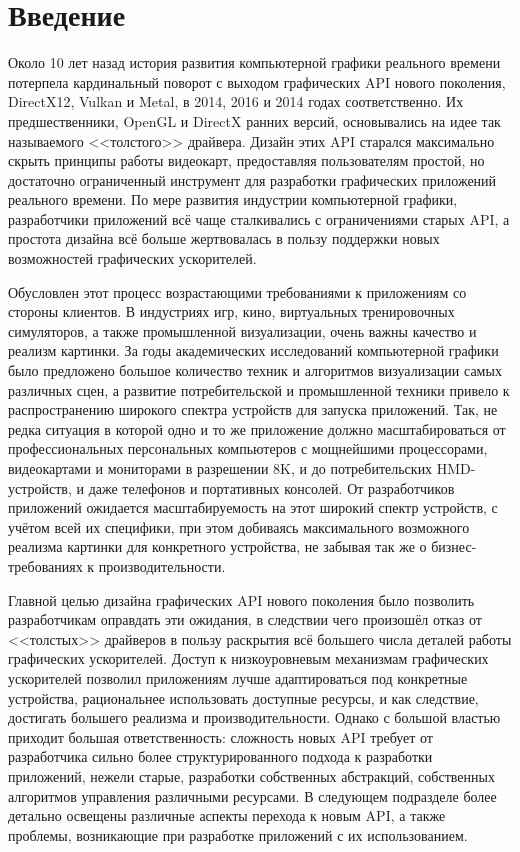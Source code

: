 \section{Введение}
Около 10 лет назад история развития компьютерной графики реального времени потерпела кардинальный поворот с выходом графических API нового поколения, DirectX12, Vulkan и Metal, в 2014, 2016 и 2014 годах соответственно.
Их предшественники, OpenGL и DirectX ранних версий, основывались на идее так называемого <<толстого>> драйвера.
Дизайн этих API старался максимально скрыть принципы работы видеокарт, предоставляя пользователям простой, но достаточно ограниченный инструмент для разработки графических приложений реального времени.
По мере развития индустрии компьютерной графики, разработчики приложений всё чаще сталкивались с ограничениями старых API, а простота дизайна всё больше жертвовалась в пользу поддержки новых возможностей графических ускорителей.

Обусловлен этот процесс возрастающими требованиями к приложениям со стороны клиентов.
В индустриях игр, кино, виртуальных тренировочных симуляторов, а также промышленной визуализации, очень важны качество и реализм картинки.
За годы академических исследований компьютерной графики было предложено большое количество техник и алгоритмов визуализации самых различных сцен, а развитие потребительской и промышленной техники привело к распространению широкого спектра устройств для запуска приложений.
Так, не редка ситуация в которой одно и то же приложение должно масштабироваться от профессиональных персональных компьютеров с мощнейшими процессорами, видеокартами и мониторами в разрешении 8K, и до потребительских HMD-устройств, и даже телефонов и портативных консолей.
От разработчиков приложений ожидается масштабируемость на этот широкий спектр устройств, с учётом всей их специфики, при этом добиваясь максимального возможного реализма картинки для конкретного устройства, не забывая так же о бизнес-требованиях к производительности.

Главной целью дизайна графических API нового поколения было позволить разработчикам оправдать эти ожидания, в следствии чего произошёл отказ от <<толстых>> драйверов в пользу раскрытия всё большего числа деталей работы графических ускорителей.
Доступ к низкоуровневым механизмам графических ускорителей позволил приложениям лучше адаптироваться под конкретные устройства, рациональнее использовать доступные ресурсы, и как следствие, достигать большего реализма и производительности.
Однако с большой властью приходит большая ответственность: сложность новых API требует от разработчика сильно более структурированного подхода к разработки приложений, нежели старые, разработки собственных абстракций, собственных алгоритмов управления различными ресурсами.
В следующем подразделе более детально освещены различные аспекты перехода к новым API, а также проблемы, возникающие при разработке приложений с их использованием.

